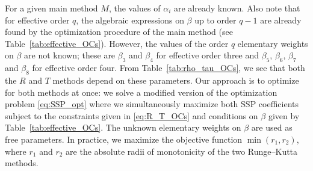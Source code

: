 For a given main method $M$, the values of $\alpha_i$ are already known.
Also note that for effective order $q$, the algebraic expressions on
$\beta$ up to order $q-1$ are already found by the optimization procedure of 
the main method (see Table~\ref{tab:effective_OCs}). 
However, the values of the order $q$ elementary weights on $\beta$ are not 
known; these are $\beta_3$ and $\beta_4$ for effective order three and
$\beta_5$, $\beta_6$, $\beta_7$ and $\beta_8$ for effective order four.
From Table~\ref{tab:rho_tau_OCs}, we see that both the $R$ and $T$
methods depend on these parameters.
Our approach is to optimize for both methods at once: we solve a
modified version of the optimization problem \eqref{eq:SSP_opt} where
we simultaneously maximize both SSP coefficients subject to the
constraints given in \eqref{eq:R_T_OCs} and conditions on $\beta$ given by 
Table~\ref{tab:effective_OCs}. 
The unknown elementary weights on $\beta$ are used as free parameters.
In practice, we maximize the objective function $\min(r_1,r_2)$, where $r_1$ 
and $r_2$ are the absolute radii of monotonicity of the two Runge--Kutta 
methods.

